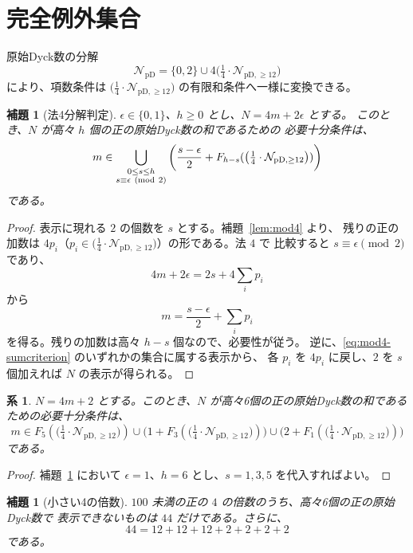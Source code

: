 \documentclass[12pt]{ltjsarticle}
\theoremstyle{plain}
\newtheorem{lemma}[theorem]{補題}
\newtheorem{corollary}[theorem]{系}
\theoremstyle{definition}
\theoremstyle{plain}
\newcommand{\NpD}{\mathcal{N}_{\mathrm{pD}}}
\newcommand{\Pset}{%
  \bigl(\tfrac{1}{4}\cdot\mathcal{N}_{\mathrm{pD},\geq 12}\bigr)%
}
\begin{document}
\section{完全例外集合}\label{sec:exceptions}

原始Dyck数の分解
\[
 \NpD=\{0,2\}\cup4\Pset
\]
により、項数条件は $\Pset$ の有限和条件へ一様に変換できる。

\begin{lemma}[法4分解判定]\label{lem:mod4-sumcriterion}
$\epsilon\in\{0,1\}$、$h\geq0$ とし、$N=4m+2\epsilon$ とする。
このとき、$N$ が高々 $h$ 個の正の原始Dyck数の和であるための
必要十分条件は、
\begin{equation}\label{eq:mod4-sumcriterion}
 m\in
 \bigcup_{\substack{0\leq s\leq h\\ s\equiv\epsilon\ ({\rm mod}\ 2)}}
 \left(\frac{s-\epsilon}{2}+F_{h-s}(\Pset)\right)
\end{equation}
である。
\end{lemma}

\begin{proof}
表示に現れる $2$ の個数を $s$ とする。補題~\ref{lem:mod4} より、
残りの正の加数は $4p_i$（$p_i\in\Pset$）の形である。法 $4$ で
比較すると $s\equiv\epsilon\pmod2$ であり、
\[
 4m+2\epsilon=2s+4\sum_i p_i
\]
から
\[
 m=\frac{s-\epsilon}{2}+\sum_i p_i
\]
を得る。残りの加数は高々 $h-s$ 個なので、必要性が従う。
逆に、\eqref{eq:mod4-sumcriterion} のいずれかの集合に属する表示から、
各 $p_i$ を $4p_i$ に戻し、$2$ を $s$ 個加えれば $N$ の表示が得られる。
\end{proof}

\begin{corollary}\label{lem:sixcriterion}
$N=4m+2$ とする。このとき、$N$ が高々6個の正の原始Dyck数の和である
ための必要十分条件は、
\begin{equation}\label{eq:sixcriterion}
 m\in F_5(\Pset)
 \cup\bigl(1+F_3(\Pset)\bigr)
 \cup\bigl(2+F_1(\Pset)\bigr)
\end{equation}
である。
\end{corollary}

\begin{proof}
補題~\ref{lem:mod4-sumcriterion} において
$\epsilon=1$、$h=6$ とし、$s=1,3,5$ を代入すればよい。
\end{proof}

\begin{lemma}[小さい4の倍数]\label{lem:smallmultiples}
$100$ 未満の正の $4$ の倍数のうち、高々6個の正の原始Dyck数で
表示できないものは $44$ だけである。さらに、
\[
 44=12+12+12+2+2+2+2
\]
である。
\end{lemma}
\end{document}
